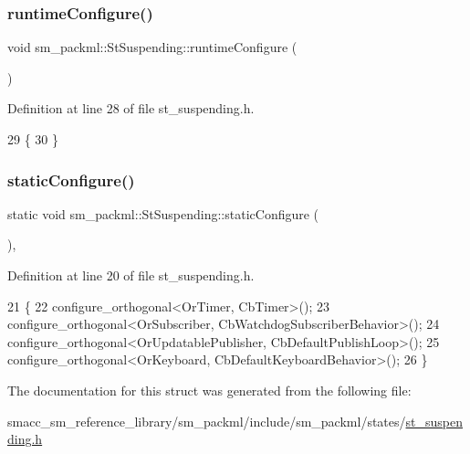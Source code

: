 \subsubsection{\texorpdfstring{runtime\+Configure()}{runtimeConfigure()}}
{\footnotesize\ttfamily void sm\+\_\+packml\+::\+St\+Suspending\+::runtime\+Configure (\begin{DoxyParamCaption}{ }\end{DoxyParamCaption})\hspace{0.3cm}{\ttfamily [inline]}}



Definition at line 28 of file st\+\_\+suspending.\+h.


\begin{DoxyCode}
29     \{
30     \}
\end{DoxyCode}
\mbox{\label{structsm__packml_1_1StSuspending_aa8991d63da69d7169fbedc8a55110eef}} 
\subsubsection{\texorpdfstring{static\+Configure()}{staticConfigure()}}
{\footnotesize\ttfamily static void sm\+\_\+packml\+::\+St\+Suspending\+::static\+Configure (\begin{DoxyParamCaption}{ }\end{DoxyParamCaption})\hspace{0.3cm}{\ttfamily [inline]}, {\ttfamily [static]}}



Definition at line 20 of file st\+\_\+suspending.\+h.


\begin{DoxyCode}
21     \{
22         configure\_orthogonal<OrTimer, CbTimer>();   
23         configure\_orthogonal<OrSubscriber, CbWatchdogSubscriberBehavior>();
24         configure\_orthogonal<OrUpdatablePublisher, CbDefaultPublishLoop>();
25         configure\_orthogonal<OrKeyboard, CbDefaultKeyboardBehavior>();
26     \}
\end{DoxyCode}


The documentation for this struct was generated from the following file\+:\begin{DoxyCompactItemize}
\item 
smacc\+\_\+sm\+\_\+reference\+\_\+library/sm\+\_\+packml/include/sm\+\_\+packml/states/\hyperlink{st__suspending_8h}{st\+\_\+suspending.\+h}\end{DoxyCompactItemize}
